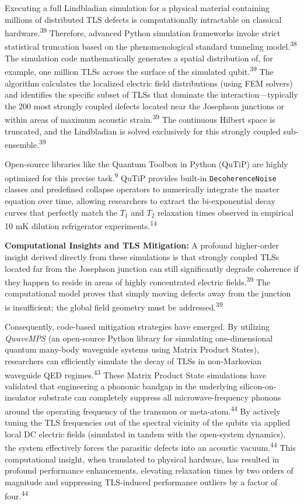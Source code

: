 \documentclass[11pt, a4paper]{article}
\begin{document}
Executing a full Lindbladian simulation for a physical material containing millions of distributed TLS defects is computationally intractable on classical hardware.\textsuperscript{39} Therefore, advanced Python simulation frameworks invoke strict statistical truncation based on the phenomenological standard tunneling model.\textsuperscript{38} The simulation code mathematically generates a spatial distribution of, for example, one million TLSs across the surface of the simulated qubit.\textsuperscript{39} The algorithm calculates the localized electric field distributions (using FEM solvers) and identifies the specific subset of TLSs that dominate the interaction---typically the 200 most strongly coupled defects located near the Josephson junctions or within areas of maximum acoustic strain.\textsuperscript{39} The continuous Hilbert space is truncated, and the Lindbladian is solved exclusively for this strongly coupled sub-ensemble.\textsuperscript{39}

Open-source libraries like the Quantum Toolbox in Python (QuTiP) are highly optimized for this precise task.\textsuperscript{9} QuTiP provides built-in \texttt{DecoherenceNoise} classes and predefined collapse operators to numerically integrate the master equation over time, allowing researchers to extract the bi-exponential decay curves that perfectly match the $T_1$ and $T_2$ relaxation times observed in empirical 10 mK dilution refrigerator experiments.\textsuperscript{14}

\textbf{Computational Insights and TLS Mitigation:} A profound higher-order insight derived directly from these simulations is that strongly coupled TLSs located far from the Josephson junction can still significantly degrade coherence if they happen to reside in areas of highly concentrated electric fields.\textsuperscript{39} The computational model proves that simply moving defects away from the junction is insufficient; the global field geometry must be addressed.\textsuperscript{39}

Consequently, code-based mitigation strategies have emerged. By utilizing \textit{QwaveMPS} (an open-source Python library for simulating one-dimensional quantum many-body waveguide systems using Matrix Product States), researchers can efficiently simulate the decay of TLSs in non-Markovian waveguide QED regimes.\textsuperscript{43} These Matrix Product State simulations have validated that engineering a phononic bandgap in the underlying silicon-on-insulator substrate can completely suppress all microwave-frequency phonons around the operating frequency of the transmon or meta-atom.\textsuperscript{44} By actively tuning the TLS frequencies out of the spectral vicinity of the qubits via applied local DC electric fields (simulated in tandem with the open-system dynamics), the system effectively forces the parasitic defects into an acoustic vacuum.\textsuperscript{44} This computational insight, when translated to physical hardware, has resulted in profound performance enhancements, elevating relaxation times by two orders of magnitude and suppressing TLS-induced performance outliers by a factor of four.\textsuperscript{44}
\end{document}
